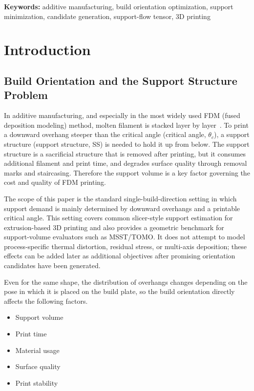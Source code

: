 \documentclass[11pt,a4paper]{article}
\begin{document}
\noindent\textbf{Keywords:} additive manufacturing, build orientation optimization, support minimization, candidate generation, support-flow tensor, 3D printing

\section{Introduction}

\subsection{Build Orientation and the Support Structure Problem}

In additive manufacturing, and especially in the most widely used FDM (fused deposition modeling) method,
molten filament is stacked layer by layer~\cite{gibson}.
To print a downward overhang steeper than the critical angle (critical angle, $\theta_c$),
a support structure (support structure, SS) is needed to hold it up from below.
The support structure is a sacrificial structure that is removed after printing, but it consumes additional filament and print time,
and degrades surface quality through removal marks and staircasing.
Therefore the support volume is a key factor governing the cost and quality of FDM printing.

The scope of this paper is the standard single-build-direction setting in which support demand is mainly determined by downward overhangs and a printable critical angle.
This setting covers common slicer-style support estimation for extrusion-based 3D printing and also provides a geometric benchmark for support-volume evaluators such as MSST/TOMO.
It does not attempt to model process-specific thermal distortion, residual stress, or multi-axis deposition; these effects can be added later as additional objectives after promising orientation candidates have been generated.

Even for the same shape, the distribution of overhangs changes depending on the pose in which it is placed on the build plate,
so the build orientation directly affects the following factors.

\begin{itemize}
\item Support volume
\item Print time
\item Material usage
\item Surface quality
\item Print stability
\end{itemize}
\end{document}
